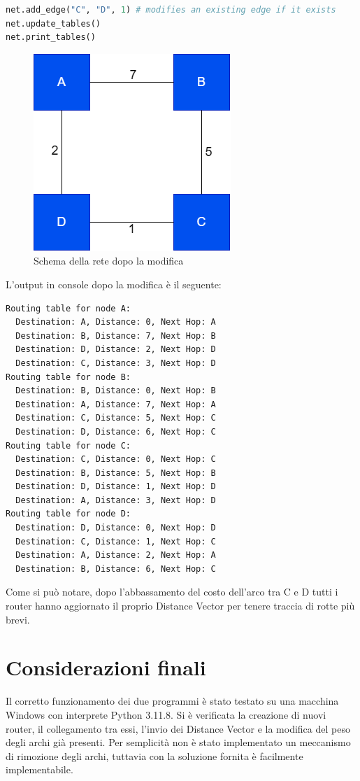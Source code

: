 \documentclass{report}
\begin{document}
\begin{lstlisting}[language=Python]
net.add_edge("C", "D", 1) # modifies an existing edge if it exists
net.update_tables()
net.print_tables()
\end{lstlisting}
\begin{figure}[h]
{
    \centering
    \includegraphics[width=0.3\linewidth]{DV-routing-example-2.png}
    \caption{Schema della rete dopo la modifica}
    \label{fig:enter-label}
    }
\end{figure}
\newpage \noindent L'output in console dopo la modifica è il seguente:
\begin{lstlisting}[numbers=none]
Routing table for node A:
  Destination: A, Distance: 0, Next Hop: A
  Destination: B, Distance: 7, Next Hop: B
  Destination: D, Distance: 2, Next Hop: D
  Destination: C, Distance: 3, Next Hop: D
Routing table for node B:
  Destination: B, Distance: 0, Next Hop: B
  Destination: A, Distance: 7, Next Hop: A
  Destination: C, Distance: 5, Next Hop: C
  Destination: D, Distance: 6, Next Hop: C
Routing table for node C:
  Destination: C, Distance: 0, Next Hop: C
  Destination: B, Distance: 5, Next Hop: B
  Destination: D, Distance: 1, Next Hop: D
  Destination: A, Distance: 3, Next Hop: D
Routing table for node D:
  Destination: D, Distance: 0, Next Hop: D
  Destination: C, Distance: 1, Next Hop: C
  Destination: A, Distance: 2, Next Hop: A
  Destination: B, Distance: 6, Next Hop: C
\end{lstlisting}
Come si può notare, dopo l'abbassamento del costo dell'arco tra C e D tutti i router hanno aggiornato il proprio Distance Vector per tenere traccia di rotte più brevi.

\chapter{Considerazioni finali}
Il corretto funzionamento dei due programmi è stato testato su una macchina Windows con interprete Python 3.11.8. Si è verificata la creazione di nuovi router, il collegamento tra essi, l'invio dei Distance Vector e la modifica del peso degli archi già presenti. Per semplicità non è stato implementato un meccanismo di rimozione degli archi, tuttavia con la soluzione fornita è facilmente implementabile. 
\end{document}
